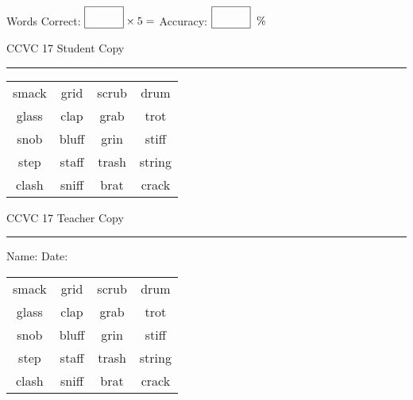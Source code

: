 \documentclass{memoir}
\begin{document}
\small

Words Correct: $\fbox{\phantom{\huge 100}} \times 5 = $ Accuracy: $\fbox{\phantom{\huge 100}}\;\; \%$ 

\vfill

\newpage


\footnotesize \noindent
CCVC 17 \hfill Student Copy
\smallskip
\hrule

\Large

\setlength{\tabcolsep}{14pt}
\def\arraystretch{3}

{\selectfont


\begin{vplace}[0.5]
\begin{center}
\begin{tabular}{cccc}
smack & grid & scrub & drum \\
glass & clap             & grab                    & trot \\
snob & bluff & grin     & stiff \\
step & staff            & trash & string \\
clash            & sniff & brat               & crack       \\
\end{tabular}
\end{center}
\end{vplace}

}

\newpage

\footnotesize \noindent
CCVC 17 \hfill Teacher Copy
\smallskip
\hrule

\small

\vfill

\noindent
Name: \underline{\hspace{1.75in}} \hfill Date: \underline{\hspace{1in}}

\Large

{\selectfont


\begin{vplace}[0.5]
\begin{center}
\begin{tabular}{cccc}
smack & grid & scrub & drum \\
glass & clap             & grab                    & trot \\
snob & bluff & grin     & stiff \\
step & staff            & trash & string \\
clash            & sniff & brat               & crack       \\
\end{tabular}
\end{center}
\end{vplace}



}
\end{document}
